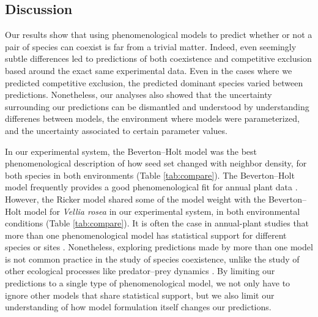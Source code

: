 \begin{refsection}
\section*{Discussion}

Our results show that using phenomenological models to predict whether or not a pair of species can coexist is far from a trivial matter. Indeed, even seemingly subtle differences led to predictions of both coexistence and competitive exclusion based around the exact same experimental data. Even in the cases where we predicted competitive exclusion, the predicted dominant species varied between predictions. Nonetheless, our analyses also showed that the uncertainty surrounding our predictions can be dismantled and understood by understanding  differenes between models, the environment where models were parameterized, and the uncertainty associated to certain parameter values.



In our experimental system, the Beverton--Holt model was the best phenomenological description of how seed set changed with neighbor density, for both species in both environments (Table \ref{tab:compare}). The Beverton--Holt model frequently provides a good phenomenological fit for annual plant data
\citep{levine2009importance, godoy_phenology_2014, godoy_phylogenetic_2014}. However, the Ricker model shared some of the model weight with the Beverton--Holt model for \textit{Vellia rosea} in our experimental system, in both environmental conditions (Table \ref{tab:compare}). It is often the case in annual-plant studies that more than one phenomenological model has statistical support for different species or sites \citep{levine2009importance,mayfield2017higher,bimler_accurate_2018,martyn2021identifying}. Nonetheless, exploring predictions made by more than one model is not common practice in the study of species coexistence, unlike the study of other ecological processes like predator--prey dynamics \citep{myerscough1996stability,fussmann2005community,aldebert2018community}. By limiting our predictions to a single type of phenomenological model, we not only have to ignore other models that share statistical support, but we also limit our understanding of how model formulation itself changes our predictions.


\end{refsection}
